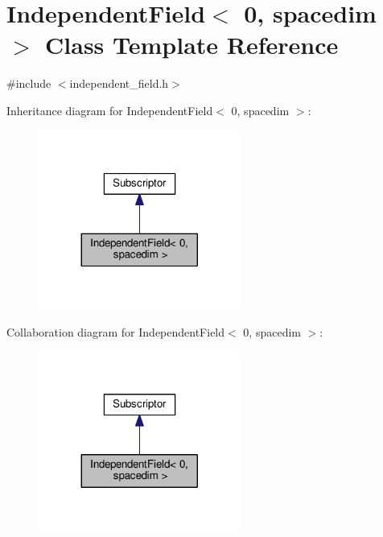 \hypertarget{class_independent_field_3_010_00_01spacedim_01_4}{}\section{Independent\+Field$<$ 0, spacedim $>$ Class Template Reference}
\label{class_independent_field_3_010_00_01spacedim_01_4}


{\ttfamily \#include $<$independent\+\_\+field.\+h$>$}



Inheritance diagram for Independent\+Field$<$ 0, spacedim $>$\+:\nopagebreak
\begin{figure}[H]
\begin{center}
\leavevmode
\includegraphics[width=188pt]{class_independent_field_3_010_00_01spacedim_01_4__inherit__graph}
\end{center}
\end{figure}


Collaboration diagram for Independent\+Field$<$ 0, spacedim $>$\+:\nopagebreak
\begin{figure}[H]
\begin{center}
\leavevmode
\includegraphics[width=188pt]{class_independent_field_3_010_00_01spacedim_01_4__coll__graph}
\end{center}
\end{figure}
